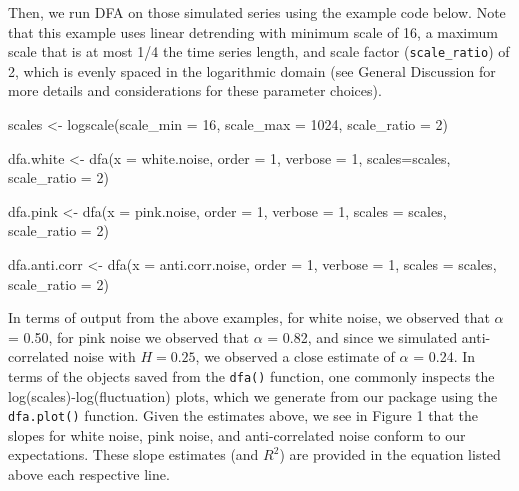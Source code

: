 \documentclass[
  man]{apa6}
\newenvironment{Shaded}{\begin{snugshade}}{\end{snugshade}}
\newcommand{\AttributeTok}[1]{\textcolor[rgb]{0.77,0.63,0.00}{#1}}
\newcommand{\DecValTok}[1]{\textcolor[rgb]{0.00,0.00,0.81}{#1}}
\newcommand{\FunctionTok}[1]{\textcolor[rgb]{0.00,0.00,0.00}{#1}}
\newcommand{\NormalTok}[1]{#1}
\newcommand{\OtherTok}[1]{\textcolor[rgb]{0.56,0.35,0.01}{#1}}
\begin{document}
Then, we run DFA on those simulated series using the example code below.
Note that this example uses linear detrending with minimum scale of 16,
a maximum scale that is at most 1/4 the time series length, and scale
factor (\texttt{scale\_ratio}) of 2, which is evenly spaced in the logarithmic
domain (see General Discussion for more details and considerations for
these parameter choices).

\begin{Shaded}
\begin{Highlighting}[]
\NormalTok{scales }\OtherTok{\textless{}{-}} \FunctionTok{logscale}\NormalTok{(}\AttributeTok{scale\_min =} \DecValTok{16}\NormalTok{, }\AttributeTok{scale\_max =} \DecValTok{1024}\NormalTok{, }\AttributeTok{scale\_ratio =} \DecValTok{2}\NormalTok{)}

\NormalTok{dfa.white }\OtherTok{\textless{}{-}} \FunctionTok{dfa}\NormalTok{(}\AttributeTok{x =}\NormalTok{ white.noise, }\AttributeTok{order =} \DecValTok{1}\NormalTok{, }\AttributeTok{verbose =} \DecValTok{1}\NormalTok{, }
\AttributeTok{scales=}\NormalTok{scales, }\AttributeTok{scale\_ratio =} \DecValTok{2}\NormalTok{)}

\NormalTok{dfa.pink }\OtherTok{\textless{}{-}} \FunctionTok{dfa}\NormalTok{(}\AttributeTok{x =}\NormalTok{ pink.noise, }\AttributeTok{order =} \DecValTok{1}\NormalTok{, }\AttributeTok{verbose =} \DecValTok{1}\NormalTok{,}
\AttributeTok{scales =}\NormalTok{ scales, }\AttributeTok{scale\_ratio =} \DecValTok{2}\NormalTok{)}

\NormalTok{dfa.anti.corr }\OtherTok{\textless{}{-}} \FunctionTok{dfa}\NormalTok{(}\AttributeTok{x =}\NormalTok{ anti.corr.noise, }\AttributeTok{order =} \DecValTok{1}\NormalTok{, }\AttributeTok{verbose =} \DecValTok{1}\NormalTok{, }
\AttributeTok{scales =}\NormalTok{ scales, }\AttributeTok{scale\_ratio =} \DecValTok{2}\NormalTok{)}
\end{Highlighting}
\end{Shaded}

In terms of output from the above examples, for white noise, we observed
that \(\alpha\) = 0.50, for pink noise we observed that
\(\alpha\) = 0.82, and since we simulated anti-correlated
noise with \(H = 0.25\), we observed a close estimate of \(\alpha\) =
0.24. In terms of the objects saved from the \texttt{dfa()}
function, one commonly inspects the log(scales)-log(fluctuation) plots,
which we generate from our package using the \texttt{dfa.plot()} function.
Given the estimates above, we see in Figure 1 that the slopes for white
noise, pink noise, and anti-correlated noise conform to our
expectations. These slope estimates (and \(R^2\)) are provided in the
equation listed above each respective line.
\end{document}
